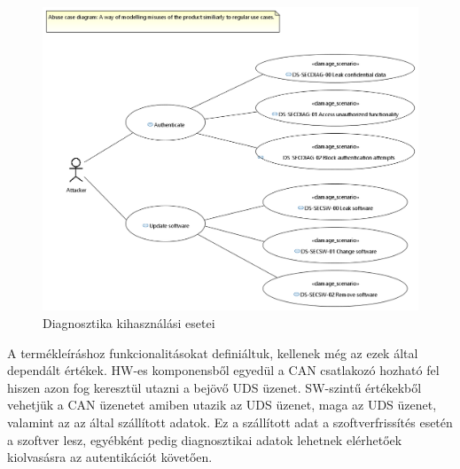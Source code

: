 \begin{figure}[!ht]
	\centering
	\includegraphics[width=120mm, keepaspectratio]{figures/06_01_abuse_case_diagram.PNG}
	\caption{Diagnosztika kihasználási esetei}
	\label{fig:diag_abuse}
\end{figure}

A termékleíráshoz funkcionalitásokat definiáltuk, kellenek még az ezek által dependált értékek. HW-es komponensből egyedül a CAN csatlakozó hozható fel hiszen azon fog keresztül utazni a bejövő UDS üzenet. SW-szintű értékekből vehetjük a CAN üzenetet amiben utazik az UDS üzenet, maga az UDS üzenet, valamint az az által szállított adatok. Ez a szállított adat a szoftverfrissítés esetén a szoftver lesz, egyébként pedig diagnosztikai adatok lehetnek elérhetőek kiolvasásra az autentikációt követően.


